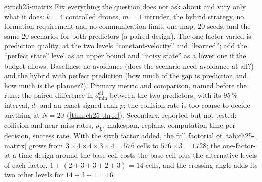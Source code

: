 
\begin{solution}{exr:ch25-matrix}
Fix everything the question does not ask about and vary only what it does: $k = 4$ controlled drones, $m = 1$ intruder, the hybrid strategy, no formation requirement and no communication limit, one map, $20$ seeds, and the same $20$ scenarios for both predictors (a paired design). The one factor varied is prediction quality, at the two levels ``constant-velocity'' and ``learned''; add the ``perfect state'' level as an upper bound and ``noisy state'' as a lower one if the budget allows. Baselines: no avoidance (does the scenario need avoidance at all?) and the hybrid with perfect prediction (how much of the gap is prediction and how much is the planner?). Primary metric and comparison, named before the runs: the paired difference in $d_{\min}^{\mathrm{di}}$ between the two predictors, with its $95\,\%$ interval, $d_z$ and an exact signed-rank $p$; the collision rate is too coarse to decide anything at $N = 20$ (\cref{thm:ch25-three}). Secondary, reported but not tested: collision and near-miss rates, $\rho_L$, makespan, replans, computation time per decision, success rate. With the sixth factor added, the full factorial of \cref{tab:ch25-matrix} grows from $3 \times 4 \times 4 \times 3 \times 4 = 576$ cells to $576 \times 3 = 1728$; the one-factor-at-a-time design around the base cell costs the base cell plus the alternative levels of each factor, $1 + (2 + 3 + 3 + 2 + 3) = 14$ cells, and the crossing angle adds its two other levels for $14 + 3 - 1 = 16$.
\end{solution}


